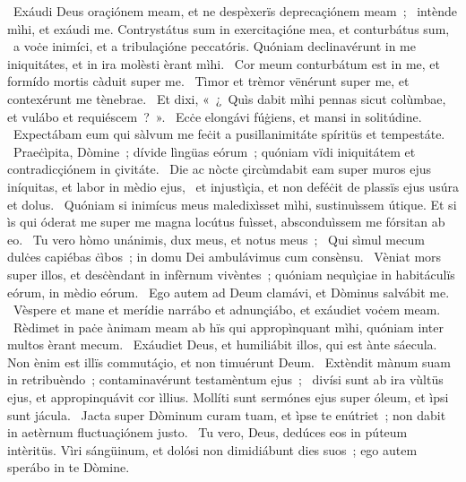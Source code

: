 \psalmChapterWithInscription{}
{ }
{%
~Exáudi Deus oraçiónem meam, et ne despèxerïs deprecaçiónem meam~; 
~intènde mìhi, et exáudi me. Contrystátus sum in exercitaçióne mea, et conturbátus sum, 
~a voċe inimíci, et a tribulaçióne peccatóris. Quóniam declinavérunt in me iniquitátes, et in ira molèsti èrant mìhi. 
~Cor meum conturbátum est in me, et formído mortis càduit super me. 
~Tìmor et trèmor vënérunt super me, et contexérunt me tènebrae. 
~Et dixi, «~¿~Quìs dabit mìhi pennas sicut colùmbae, et vulábo et requiéscem~?~». 
~Ecċe elongávi fúġiens, et mansi in solitúdine. 
~Expectábam eum qui sàlvum me feċit a pusillanimitáte spíritüs et tempestáte. 
~Praeċìpita, Dòmine~; dívide lìngüas eórum~; quóniam vïdi iniquitátem et contradicçiónem in çivitáte. 
~Die ac nòcte çircùmdabit eam super muros ejus iníquitas, et labor in mèdio ejus, 
~et injustìçia, et non deféċit de plassïs ejus usúra et dolus. 
~Quóniam si inimícus meus maledixìsset mìhi, sustinuìssem útique. Et si ìs qui óderat me super me magna locútus fuìsset, absconduìssem me fórsitan ab eo. 
~Tu vero hòmo unánimis, dux meus, et notus meus~; 
~Qui sìmul mecum dulċes capiébas ċìbos~; in domu Dei ambulávimus cum consènsu. 
~Vèniat mors super illos, et desċèndant in infèrnum vivèntes~; quóniam nequìçiae in habitáculïs eórum, in mèdio eórum. 
~Ego autem ad Deum clamávi, et Dòminus salvábit me. 
~Vèspere et mane et merídie narrábo et adnunçiábo, et exáudiet voċem meam. 
~Rèdimet in paċe ànimam meam ab hïs qui appropìnquant mìhi, quóniam inter multos èrant mecum. 
~Exáudiet Deus, et humiliábit illos, qui est ànte sáecula. Non ènim est illïs commutáçio, et non timuérunt Deum. 
~Extèndit mànum suam in retribuèndo~; contaminavérunt testamèntum ejus~; 
~divísi sunt ab ira vùltüs ejus, et appropinquávit cor ìllius. Mollíti sunt sermónes ejus super óleum, et ìpsi sunt jácula. 
~Jacta super Dòminum curam tuam, et ìpse te enútriet~; non dabit in aetèrnum fluctuaçiónem justo. 
~Tu vero, Deus, dedúces eos in púteum intèritüs. Vìri sángüinum, et dolósi non dimidiábunt dies suos~; ego autem sperábo in te Dòmine. 
}
